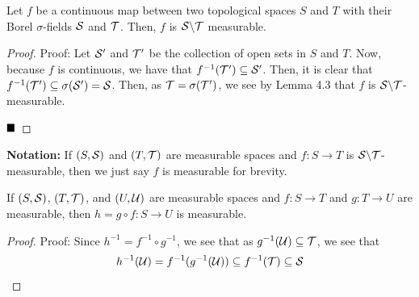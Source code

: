 \begin{lemma}
    Let $f$ be a continuous map between two topological spaces $S$ and $T$ with their Borel $\sigma$-fields $\cal{S}$ and $\cal{T}$. Then, $f$ is $\cal{S} \backslash \cal{T}$ measurable.
\end{lemma}
\begin{proof}{Proof:}
    Let $\cal{S}'$ and $\cal{T}'$ be the collection of open sets in $S$ and $T$. Now, because $f$ is continuous, we have that $f^{-1}(\cal{T}') \subseteq \cal{S}'$. Then, it is clear that $f^{-1}(\cal{T}') \subseteq \sigma(\cal{S}') = \cal{S}$. Then, as $\cal{T} = \sigma(\cal{T}')$, we see by Lemma 4.3 that $f$ is $\cal{S}\backslash \cal{T}$-measurable. 

    $\qed$
\end{proof}

\textbf{Notation:} If $(S, \cal{S})$ and $(T, \cal{T})$ are measurable spaces and $f : S \to T$ is $\cal{S}\backslash \cal{T}$-measurable, then we just say $f$ is measurable for brevity.\\

\begin{lemma}
    If $(S, \cal{S})$, $(T, \cal{T})$, and $(U, \cal{U})$ are measurable spaces and $f : S \to T$ and $g : T \to U$ are measurable, then $h = g \circ f : S \to U$ is measurable.
\end{lemma}
\begin{proof}{Proof:}
    Since $h^{-1} = f^{-1} \circ g^{-1}$, we see that as $g^{-1}(\cal{U}) \subseteq \cal{T}$, we see that
    \[ h^{-1}(\cal{U}) = f^{-1}(g^{-1}(\cal{U})) \subseteq f^{-1}(\cal{T}) \subseteq \cal{S} \]
\end{proof}

